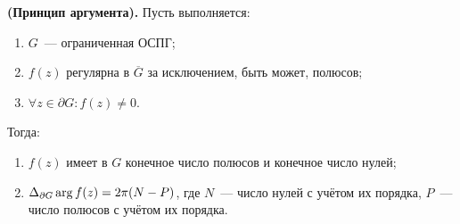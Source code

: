 \begin{statement}\label{27:principe_of_argument}
\textbf{(Принцип аргумента).} Пусть выполняется:
\begin{enumerate}[wide=20pt, itemsep=0ex]
\item \(G\)~--- ограниченная ОСПГ;
\item \(f(z)\) регулярна в \(\overline{G}\) за исключением, быть может, полюсов;
\item \(\forall z \in \partial G \colon f(z) \ne 0\).
\end{enumerate}
Тогда:
\begin{enumerate}[wide=20pt, itemsep=0ex]
\item \(f(z)\) имеет в \(G\) конечное число полюсов и конечное число нулей; 
\item \(\Delta_{\partial G} \operatorname{arg} f(z) = 2\pi(N-P)\), где \(N\)~--- число нулей с учётом их порядка, 
    \(P\)~--- число полюсов с учётом их порядка.
\end{enumerate}
\end{statement}

